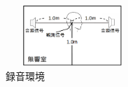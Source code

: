 \documentclass[autodetect-engine,dvi=dvipdfmx,ja=standard,twocolumn,jbase=13.35Q]{bxjsarticle}
\begin{document}

\begin{figure}[htbp]
     \begin{center}
     \includegraphics[clip, width=2.0in, height = 0.9in]{picture/environment.png}
     \end{center}
     \caption{録音環境}\label{fig:0}
\end{figure}

\end{document}
